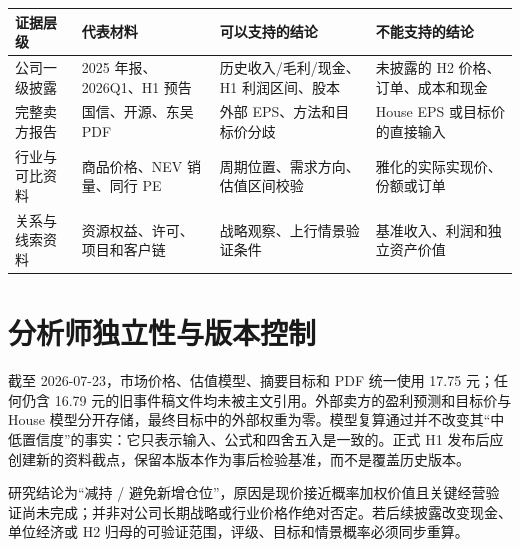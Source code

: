 \begin{exhibitbox}[表 A-10：证据到模型的控制链]
\begin{tabularx}{\exhibitboxwidth}{L{2.6cm}L{3.0cm}X X}
\toprule
证据层级 & 代表材料 & 可以支持的结论 & 不能支持的结论 \\
\midrule
公司一级披露 & 2025 年报、2026Q1、H1 预告 & 历史收入/毛利/现金、H1 利润区间、股本 & 未披露的 H2 价格、订单、成本和现金 \\
完整卖方报告 & 国信、开源、东吴 PDF & 外部 EPS、方法和目标价分歧 & House EPS 或目标价的直接输入 \\
行业与可比资料 & 商品价格、NEV 销量、同行 PE & 周期位置、需求方向、估值区间校验 & 雅化的实际实现价、份额或订单 \\
关系与线索资料 & 资源权益、许可、项目和客户链 & 战略观察、上行情景验证条件 & 基准收入、利润和独立资产价值 \\
\bottomrule
\end{tabularx}
\end{exhibitbox}

\section{分析师独立性与版本控制}

截至 2026-07-23，市场价格、估值模型、摘要目标和 PDF 统一使用 17.75 元；任何仍含 16.79 元的旧事件稿文件均未被主文引用。外部卖方的盈利预测和目标价与 House 模型分开存储，最终目标中的外部权重为零。模型复算通过并不改变其“中低置信度”的事实：它只表示输入、公式和四舍五入是一致的。正式 H1 发布后应创建新的资料截点，保留本版本作为事后检验基准，而不是覆盖历史版本。

\begin{sourcequalitybox}[本报告的责任边界]
研究结论为“减持 / 避免新增仓位”，原因是现价接近概率加权价值且关键经营验证尚未完成；并非对公司长期战略或行业价格作绝对否定。若后续披露改变现金、单位经济或 H2 归母的可验证范围，评级、目标和情景概率必须同步重算。
\end{sourcequalitybox}

